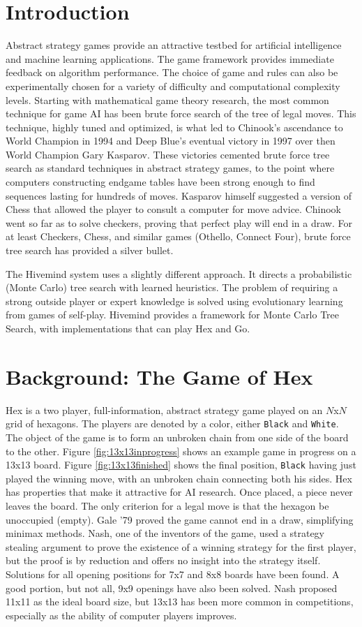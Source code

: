 \documentclass[11pt]{report}
\newcommand{\black}{\texttt{Black}}
\newcommand{\white}{\texttt{White}}
\begin{document}
\section{Introduction}
Abstract strategy games provide an attractive testbed for artificial intelligence and machine learning applications. The game framework provides immediate feedback on algorithm performance. The choice of game and rules can also be experimentally chosen for a variety of difficulty and computational complexity levels. Starting with mathematical game theory research, the most common technique for game AI has been brute force search of the tree of legal moves. This technique, highly tuned and optimized, is what led to Chinook's ascendance to World Champion in 1994 and Deep Blue's eventual victory in 1997 over then World Champion Gary Kasparov. These victories cemented brute force tree search as standard techniques in abstract strategy games, to the point where computers constructing endgame tables have been strong enough to find sequences lasting for hundreds of moves. Kasparov himself suggested a version of Chess that allowed the player to consult a computer for move advice. Chinook went so far as to solve checkers, proving that perfect play will end in a draw. For at least Checkers, Chess, and similar games (Othello, Connect Four), brute force tree search has provided a silver bullet.

The Hivemind system uses a slightly different approach. It directs a probabilistic (Monte Carlo) tree search with learned heuristics. The problem of requiring a strong outside player or expert knowledge is solved using evolutionary learning from games of self-play. Hivemind provides a framework for Monte Carlo Tree Search, with implementations that can play Hex and Go.

\section{Background: The Game of Hex}
Hex is a two player, full-information, abstract strategy game played on an $N$x$N$ grid of hexagons. The players are denoted by  a color, either \black{} and \white. The object of the game is to form an unbroken chain from one side of the board to the other. Figure \ref{fig:13x13inprogress} shows an example game in progress on a 13x13 board. Figure \ref{fig:13x13finished} shows the final position, \black{} having just played the winning move, with an unbroken chain connecting both his sides. Hex has properties that make it attractive for AI research. Once placed, a piece never leaves the board. The only criterion for a legal move is that the hexagon be unoccupied (empty). Gale '79 proved the game cannot end in a draw, simplifying minimax methods. Nash, one of the inventors of the game, used a strategy stealing argument to prove the existence of a winning strategy for the first player, but the proof is by reduction and offers no insight into the strategy itself. Solutions for all opening positions for 7x7 and 8x8 boards have been found\cite{henderson2009solving}. A good portion, but not all, 9x9 openings have also been solved. Nash proposed 11x11 as the ideal board size, but 13x13 has been more common in competitions, especially as the ability of computer players improves.
\end{document}
